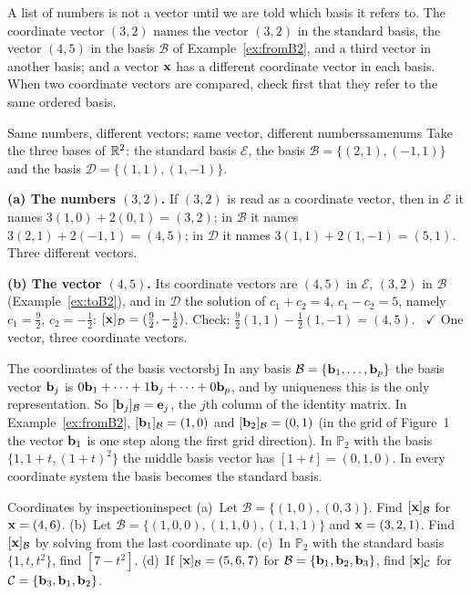 \documentclass[11pt]{article}
\begin{document}
\begin{warn}
A list of numbers is not a vector until we are told which basis it refers to. The coordinate vector $(3,2)$ names the vector $(3,2)$ in the standard basis, the vector $(4,5)$ in the basis $\mathcal{B}$ of Example~\ref{ex:fromB2}, and a third vector in another basis; and a vector $\mathbf{x}$ has a different coordinate vector in each basis. When two coordinate vectors are compared, check first that they refer to the same ordered basis.
\end{warn}

\begin{exmp}{Same numbers, different vectors; same vector, different numbers}{samenums}
Take the three bases of $\mathbb{R}^2$: the standard basis $\mathcal{E}$, the basis $\mathcal{B}=\{(2,1),(-1,1)\}$ and the basis $\mathcal{D}=\{(1,1),(1,-1)\}$.

\textbf{(a) The numbers $(3,2)$.} If $(3,2)$ is read as a coordinate vector, then in $\mathcal{E}$ it names $3(1,0)+2(0,1)=(3,2)$; in $\mathcal{B}$ it names $3(2,1)+2(-1,1)=(4,5)$; in $\mathcal{D}$ it names $3(1,1)+2(1,-1)=(5,1)$. Three different vectors.

\textbf{(b) The vector $(4,5)$.} Its coordinate vectors are $(4,5)$ in $\mathcal{E}$, $(3,2)$ in $\mathcal{B}$ (Example~\ref{ex:toB2}), and in $\mathcal{D}$ the solution of $c_1+c_2=4$, $c_1-c_2=5$, namely $c_1=\tfrac92$, $c_2=-\tfrac12$: $[\mathbf{x}]_{\mathcal{D}}=(\tfrac92,-\tfrac12)$. Check: $\tfrac92(1,1)-\tfrac12(1,-1)=(4,5)$. \ $\checkmark$ One vector, three coordinate vectors.
\end{exmp}

\begin{exmp}{The coordinates of the basis vectors}{bj}
In any basis $\mathcal{B}=\{\mathbf{b}_1,\dots,\mathbf{b}_p\}$ the basis vector $\mathbf{b}_j$ is $0\mathbf{b}_1+\cdots+1\mathbf{b}_j+\cdots+0\mathbf{b}_p$, and by uniqueness this is the only representation. So $[\mathbf{b}_j]_{\mathcal{B}}=\mathbf{e}_j$, the $j$th column of the identity matrix. In Example~\ref{ex:fromB2}, $[\mathbf{b}_1]_{\mathcal{B}}=(1,0)$ and $[\mathbf{b}_2]_{\mathcal{B}}=(0,1)$ (in the grid of Figure~1 the vector $\mathbf{b}_1$ is one step along the first grid direction). In $\mathbb{P}_2$ with the basis $\{1,1+t,(1+t)^2\}$ the middle basis vector has $[1+t]=(0,1,0)$. In every coordinate system the basis becomes the standard basis.
\end{exmp}

\begin{kc}{Coordinates by inspection}{inspect}
(a)~Let $\mathcal{B}=\{(1,0),(0,3)\}$. Find $[\mathbf{x}]_{\mathcal{B}}$ for $\mathbf{x}=(4,6)$. (b)~Let $\mathcal{B}=\{(1,0,0),(1,1,0),(1,1,1)\}$ and $\mathbf{x}=(3,2,1)$. Find $[\mathbf{x}]_{\mathcal{B}}$ by solving from the last coordinate up. (c)~In $\mathbb{P}_2$ with the standard basis $\{1,t,t^2\}$, find $[7-t^2]$. (d)~If $[\mathbf{x}]_{\mathcal{B}}=(5,6,7)$ for $\mathcal{B}=\{\mathbf{b}_1,\mathbf{b}_2,\mathbf{b}_3\}$, find $[\mathbf{x}]_{\mathcal{C}}$ for $\mathcal{C}=\{\mathbf{b}_3,\mathbf{b}_1,\mathbf{b}_2\}$.
\end{kc}
\end{document}
